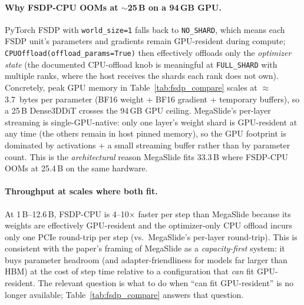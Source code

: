 \documentclass[11pt, letterpaper]{article}
\begin{document}
\paragraph{Why FSDP-CPU OOMs at $\sim$25\,B on a 94\,GB GPU.} PyTorch FSDP with \texttt{world\_size=1} falls back to \texttt{NO\_SHARD}, which means each FSDP unit's parameters and gradients remain GPU-resident during compute; \texttt{CPUOffload(offload\_params=True)} then effectively offloads only the \emph{optimizer state} (the documented CPU-offload knob is meaningful at \texttt{FULL\_SHARD} with multiple ranks, where the host receives the shards each rank does not own). Concretely, peak GPU memory in Table~\ref{tab:fsdp_compare} scales at $\approx$3.7~bytes per parameter (BF16 weight + BF16 gradient + temporary buffers), so a 25\,B Dense3DDiT crosses the 94\,GB GPU ceiling. MegaSlide's per-layer streaming is single-GPU-native: only one layer's weight shard is GPU-resident at any time (the others remain in host pinned memory), so the GPU footprint is dominated by activations + a small streaming buffer rather than by parameter count. This is the \emph{architectural} reason MegaSlide fits 33.3\,B where FSDP-CPU OOMs at 25.4\,B on the same hardware.

\paragraph{Throughput at scales where both fit.} At 1\,B--12.6\,B, FSDP-CPU is 4--10$\times$ faster per step than MegaSlide because its weights are effectively GPU-resident and the optimizer-only CPU offload incurs only one PCIe round-trip per step (vs.\ MegaSlide's per-layer round-trip). This is consistent with the paper's framing of MegaSlide as a \emph{capacity-first} system: it buys parameter headroom (and adapter-friendliness for models far larger than HBM) at the cost of step time relative to a configuration that \emph{can} fit GPU-resident. The relevant question is what to do when ``can fit GPU-resident'' is no longer available; Table~\ref{tab:fsdp_compare} answers that question.
\end{document}

